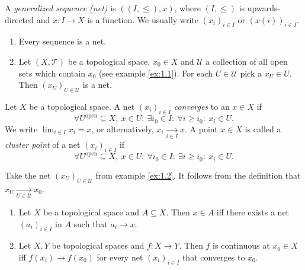 \begin{definition}
    A \emph{generalized sequence (net)} is $((I, \leq), x)$, where $(I, \leq)$
    is upwards-directed and $x: I \to X$ is a function. We usually write $(x_i)_{i \in I}$ or $(x(i))_{i \in I}$.
\end{definition}

\begin{example}\label{ex:1.2}
    \begin{enumerate}
        \item Every sequence is a net.
        \item Let $(X, \mathcal{T})$ be a topological space, $x_0 \in X$ and $\mathcal{U}$ a collection of all open sets which contain $x_0$ (see example \ref{ex:1.1}).
        For each $U \in \mathcal{U}$ pick a $x_U \in U$. Then $(x_U)_{U \in \mathcal{U}}$ is a net.
    \end{enumerate}
\end{example}

\begin{definition}
    Let $X$ be a topological space. A net $(x_i)_{i \in I}$ \emph{converges} to an $x \in X$
    if
    $$\forall U^{\textrm{open}} \subseteq X,\ x \in U:\ \exists i_0 \in I:\ \forall i \geq i_0:\ x_i \in U.$$
    We write $\lim_{i \in I} x_i = x$, or alternatively, $x_i \xrightarrow[i \in I]{} x$.
    A point $x \in X$ is called a \emph{cluster point} of a net $(x_i)_{i \in I}$ if 
    $$\forall U^{\textrm{open}} \subseteq X,\ x \in U:\ \forall i_0 \in I:\ \exists i \geq i_0:\ x_i \in U.$$
\end{definition}

\begin{example}
        Take the net $(x_U)_{U \in \mathcal{U}}$ from example \ref{ex:1.2}. It follows from the definition
        that $x_U \xrightarrow[U \in \mathcal{U}]{} x_0$.
\end{example}

\begin{proposition}\label{prop:1.1}
    \begin{enumerate}
        \item Let $X$ be a topological space and $A \subseteq X$. Then $x \in \overline{A}$ iff there exists a net $(a_i)_{i \in I}$ in $A$ such that $a_i \to x$.
        \item Let $X, Y$ be topological spaces and $f: X \to Y$. Then $f$ is continuous at $x_0 \in X$ iff $f(x_i) \to f(x_0)$ for every net $(x_i)_{i \in I}$ that converges to $x_0$.
    \end{enumerate}
\end{proposition}

